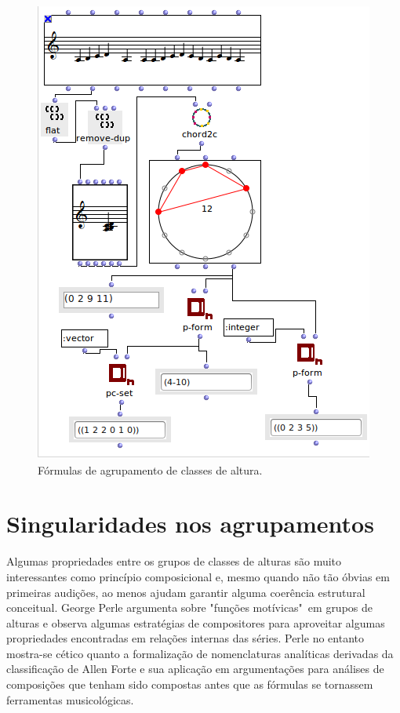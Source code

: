\documentclass[
	12pt,				%
	openright,			%
	twoside,			%
	a4paper,			%
	english,			%
	french,				%
	spanish,			%
	brazil				%
	]{abntex2}
\begin{document}
\begin{apendicesenv}
\begin{figure}[h]
	\caption{\label{fig_grafico}Fórmulas de agrupamento de classes de altura. }
	\begin{center}
	    \includegraphics[scale=0.7]{OM_settheory/forma_prima_forte_vector.png}
	\end{center}
\end{figure}


\section{Singularidades nos agrupamentos }

Algumas propriedades entre os grupos de classes de alturas são muito interessantes como princípio composicional e, mesmo quando não tão óbvias em primeiras audições, ao menos ajudam garantir alguma coerência estrutural conceitual. George Perle argumenta sobre "funções motívicas"\ em grupos de alturas \cite[p. 60-85]{perle1981serial} e observa algumas estratégias de compositores para aproveitar algumas propriedades encontradas em relações internas das séries. Perle no entanto mostra-se cético quanto a formalização de nomenclaturas analíticas derivadas da classificação de Allen Forte e sua aplicação em argumentações para análises de composições que tenham sido compostas antes que as fórmulas se tornassem ferramentas musicológicas. \cite{perle1990pitch}



\end{apendicesenv}
\end{document}
